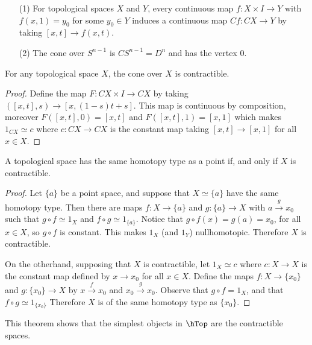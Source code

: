 \begin{example}\label{2.7}
    \begin{enumerate}
        \item[(1)] For topological spaces $X$ and  $Y$, every continuous map  $f:X \times I
            \xrightarrow{} Y$ with $f(x,1)=y_0$ for some $y_0 \in Y$ induces a
            continuous map $Cf:CX \xrightarrow{} Y$ by taking $[x,t] \xrightarrow{}
            f(x,t)$.

        \item[(2)] The cone over $S^{n-1}$ is $CS^{n-1}=D^n$ and has the vertex
            $0$.
    \end{enumerate}
\end{example}

\begin{theorem}\label{2.3.4}
    For any topological space $X$, the cone over  $X$ is contractible.
\end{theorem}
\begin{proof}
    Define the map $F:CX \times I \xrightarrow{} CX$ by taking $([x,t],s)
    \xrightarrow{} [x,(1-s)t+s]$. This map is continuous by composition,
    moreover $F([x,t],0)=[x,t]$ and $F([x,t],1)=[x,1]$ which makes $1_{CX}
    \simeq c$ where $c:CX \xrightarrow{} CX$ is the constant map taking $[x,t]
    \xrightarrow{} [x,1]$ for all $x \in X$.
\end{proof}

\begin{theorem}\label{2.3.5}
    A topological space has the same homotopy type as a point if, and only if
    $X$ is contractible.
\end{theorem}
\begin{proof}
    Let $\{a\}$ be a point space, and suppose that $X \simeq \{a\}$ have the
    same homotopy type. Then there are maps $f:X \xrightarrow{} \{a\}$ and
    $g:\{a\} \xrightarrow{} X$ with $a \xrightarrow{g} x_0$ such that  $g \circ
    f \simeq 1_X$ and  $f \circ g \simeq 1_{\{a\}}$. Notice that $g \circ
    f(x)=g(a)=x_0$, for all $x \in X$, so  $g \circ f$ is constant. This makes
    $1_X$  (and $1_Y$) nullhomotopic. Therefore $X$ is contractible.

    On the otherhand, supposing that  $X$ is contractible, let  $1_X \simeq c$
    where  $c:X \xrightarrow{} X$ is the constant map defined by $x
    \xrightarrow{} x_0$ for all $x \in X$. Define the maps  $f:X \xrightarrow{}
    \{x_0\}$ and  $g:\{x_0\} \xrightarrow{} X$ by $x \xrightarrow{f} x_0$ and
    $x_0 \xrightarrow{g} x_0$. Observe that $g \circ f=1_X$, and that $f
    \circ g \simeq 1_{\{x_0\}}$ Therefore $X$ is of the same homotopy type as
    $\{x_0\}$.
\end{proof}
\begin{remark}
    This theorem shows that the simplest objects in $\hTop$ are the contractible
    spaces.
\end{remark}

